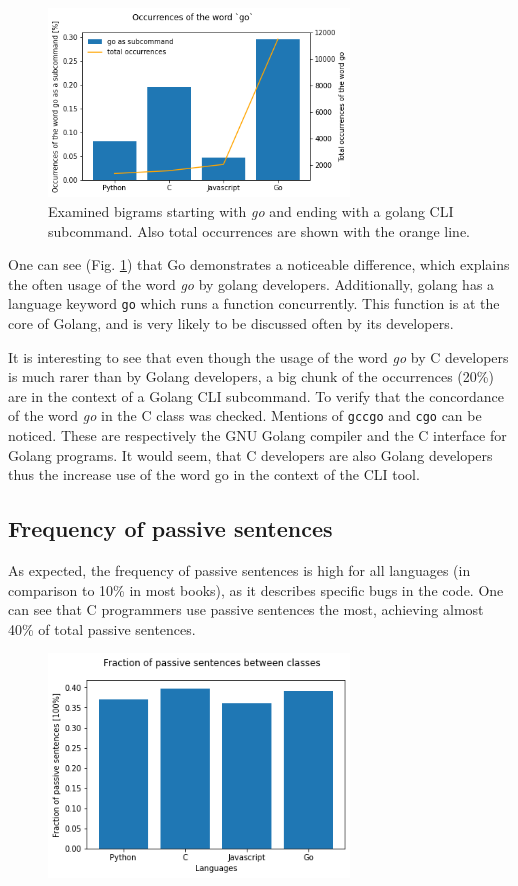 \documentclass[]{article}
\begin{document}
\begin{figure}[H]
    \centering
    \includegraphics[width=8cm]{go_occ.png}
    \caption{Examined bigrams starting with \emph{go} and ending with a golang CLI subcommand. Also total occurrences are shown with the orange line.}
    \label{fig:go-occ}
\end{figure}

One can see (Fig. \ref{fig:go-occ}) that Go demonstrates a noticeable difference, which explains the often usage of the word \emph{go} by golang developers. Additionally, golang has a language keyword \texttt{go} which runs a function concurrently. This function is at the core of Golang, and is very likely to be discussed often by its developers.

It is interesting to see that even though the usage of the word \emph{go} by C developers is much rarer than by Golang developers, a big chunk of the occurrences (20\%) are in the context of a Golang CLI subcommand. To verify that the concordance of the word \emph{go} in the C class was checked. Mentions of \texttt{gccgo} and \texttt{cgo} can be noticed. These are respectively the GNU Golang compiler and the C interface for Golang programs. It would seem, that C developers are also Golang developers thus the increase use of the word go in the context of the CLI tool.

\subsection{Frequency of passive sentences}

As expected, the frequency of passive sentences is high for all languages (in comparison to 10\% in most books), as it describes specific bugs in the code. One can see that C programmers use passive sentences the most, achieving almost 40\% of total passive sentences.

\begin{figure}[H]
    \includegraphics[width=8cm]{passives.png}
    \centering
\end{figure}
\end{document}
